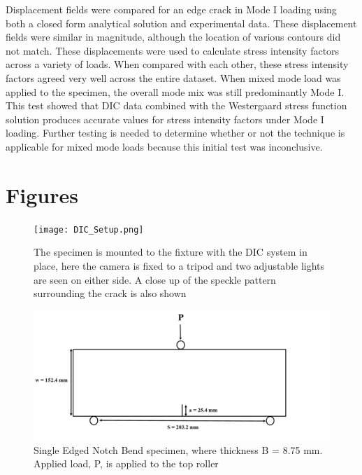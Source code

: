 \documentclass[12pt]{article}
\begin{document}
Displacement fields were compared for an edge crack in Mode I loading using both a closed form analytical solution and experimental data. These displacement fields were similar in magnitude, although the location of various contours did not match. These displacements were used to calculate stress intensity factors across a variety of loads. When compared with each other, these stress intensity factors agreed very well across the entire dataset. When mixed mode load was applied to the specimen, the overall mode mix was still predominantly Mode I. This test showed that DIC data combined with the Westergaard stress function solution produces accurate values for stress intensity factors under Mode I loading. Further testing is needed to determine whether or not the technique is applicable for mixed mode loads because this initial test was inconclusive.

\section{Figures}
\begin{figure}[H]
	\centering
	\texttt{[image: DIC\_Setup.png]}
	\caption{The specimen is mounted to the fixture with the DIC system in place, here the camera is fixed to a tripod and two adjustable lights are seen on either side. A close up of the speckle pattern surrounding the crack is also shown}
	\label{fig:DIC}
\end{figure}

\begin{figure}[H]
	\centering
	\includegraphics[width=1\textwidth]{Geometry.png}
	\caption{Single Edged Notch Bend specimen, where thickness B = 8.75 mm. Applied load, P, is applied to the top roller}
	\label{fig:Geometry}
\end{figure}
\end{document}
